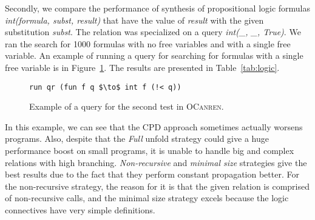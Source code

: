 \documentclass[submission,copyright,creativecommons]{eptcs}
\begin{document}
Secondly, we compare the performance of synthesis of propositional logic formulas \textit{int(formula, subst, result)}
that have the value of \textit{result} with the given substitution \textit{subst}.
The relation was specialized on a query \textit{int(_, _, True)}.
We ran the search for 1000 formulas with no free variables and with a single free variable.
An example of running a query for searching for formulas with a single free variable is in Figure~\ref{fig:runQuery2}.
The results are presented in Table~\ref{tab:logic}.

\begin{figure}[h!]
\begin{lstlisting}
run qr (fun f q $\to$ int f (!< q))
\end{lstlisting}
\caption{Example of a query for the second test in \textsc{OCanren}.}
\label{fig:runQuery2}
\end{figure}

In this example, we can see that the CPD approach sometimes
actually worsens programs.
Also, despite that the \textit{Full} unfold strategy could give a huge performance boost
on small programs,
it is unable to handle big and complex relations
with high branching.
\textit{Non-recursive} and \textit{minimal size} strategies give the best results
due to the fact that they perform constant propagation better.
For the non-recursive strategy,
the reason for it
is that 
the given relation is comprised of non-recursive calls, 
and the minimal size strategy excels
because the logic connectives have very simple definitions.
\end{document}
